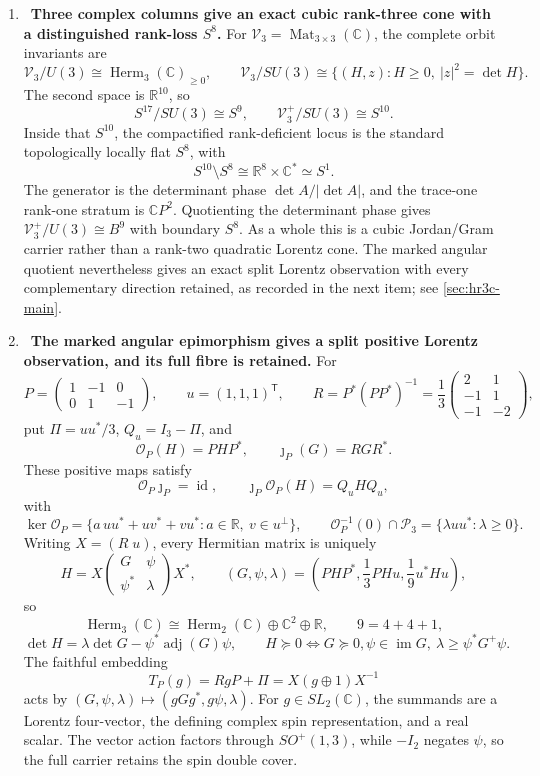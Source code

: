 \begin{enumerate}[leftmargin=1.8em,itemsep=.65em]
\item \Verified\ \textbf{Three complex columns give an exact cubic
rank-three cone with a distinguished rank-loss \(S^8\).}
For \(\mathscr V_3=\operatorname{Mat}_{3\times3}(\mathbb C)\), the complete
orbit invariants are
\[
 \mathscr V_3/U(3)\cong\operatorname{Herm}_3(\mathbb C)_{\geq0},
 \qquad
 \mathscr V_3/SU(3)
 \cong\{(H,z):H\geq0,\ |z|^2=\det H\}.
\]
The second space is \(\mathbb R^{10}\), so
\[
 S^{17}/SU(3)\cong S^9,\qquad
 \mathscr V_3^+/SU(3)\cong S^{10}.
\]
Inside that \(S^{10}\), the compactified rank-deficient locus is the
standard topologically locally flat \(S^8\), with
\[
 S^{10}\setminus S^8\cong\mathbb R^8\times\mathbb C^*\simeq S^1.
\]
The generator is the determinant phase \(\det A/|\det A|\), and the
trace-one rank-one stratum is \(\mathbb CP^2\).  Quotienting the determinant
phase gives \(\mathscr V_3^+/U(3)\cong B^9\) with boundary \(S^8\).  As a
whole this is a cubic Jordan/Gram carrier rather than a rank-two quadratic
Lorentz cone.  The marked angular quotient nevertheless gives an exact split
Lorentz observation with every complementary direction retained, as recorded
in the next item; see \cref{sec:hr3c-main}.

\item \Verified\ \textbf{The marked angular epimorphism gives a split
positive Lorentz observation, and its full fibre is retained.}
For
\[
 P=\begin{pmatrix}1&-1&0\\0&1&-1\end{pmatrix},\qquad
 u=(1,1,1)^{\mathsf T},\qquad
 R=P^*(PP^*)^{-1}
 =\frac13\begin{pmatrix}2&1\\-1&1\\-1&-2\end{pmatrix},
\]
put \(\Pi=uu^*/3\), \(Q_u=I_3-\Pi\), and
\[
 \mathcal O_P(H)=PHP^*,\qquad \jmath_P(G)=RGR^*.
\]
These positive maps satisfy
\[
 \mathcal O_P\jmath_P=\operatorname{id},\qquad
 \jmath_P\mathcal O_P(H)=Q_uHQ_u,
\]
with
\[
 \ker\mathcal O_P
 =\{a\,uu^*+uv^*+vu^*:a\in\mathbb R,\ v\in u^\perp\},\qquad
 \mathcal O_P^{-1}(0)\cap\mathcal P_3
 =\{\lambda uu^*: \lambda\geq0\}.
\]
Writing \(X=(R\;u)\), every Hermitian matrix is uniquely
\[
 H=X\begin{pmatrix}G&\psi\\\psi^*&\lambda\end{pmatrix}X^*,\qquad
 (G,\psi,\lambda)=
 \left(PHP^*,\frac13PHu,\frac19u^*Hu\right),
\]
so
\[
 \operatorname{Herm}_3(\mathbb C)
 \cong\operatorname{Herm}_2(\mathbb C)\oplus\mathbb C^2\oplus\mathbb R,
 \qquad 9=4+4+1,
\]
\[
 \det H=\lambda\det G-\psi^*\operatorname{adj}(G)\psi,\qquad
 H\succeq0\Longleftrightarrow
 G\succeq0, \psi\in\operatorname{im}G,
 \ \lambda\geq\psi^*G^+\psi.
\]
The faithful embedding
\[
 T_P(g)=RgP+\Pi=X(g\oplus1)X^{-1}
\]
acts by
\((G,\psi,\lambda)\mapsto(gGg^*,g\psi,\lambda)\).  For
\(g\in SL_2(\mathbb C)\), the summands are a Lorentz four-vector, the
defining complex spin representation, and a real scalar.  The vector action
factors through \(SO^+(1,3)\), while \(-I_2\) negates \(\psi\), so the full
carrier retains the spin double cover.


\end{enumerate}
